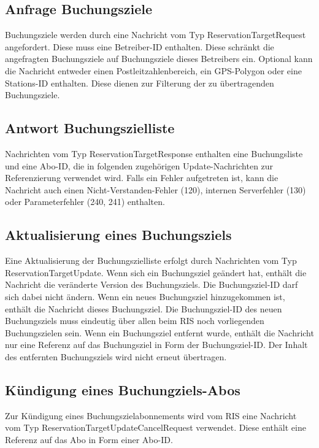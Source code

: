 

\subsection{Anfrage Buchungsziele}
Buchungsziele werden durch eine Nachricht vom Typ ReservationTargetRequest angefordert. Diese muss eine Betreiber-ID enthalten. Diese schränkt die angefragten Buchungsziele auf Buchungsziele dieses Betreibers ein. Optional kann die Nachricht entweder einen Postleitzahlenbereich, ein GPS-Polygon oder eine Stations-ID enthalten. Diese dienen zur Filterung der zu übertragenden Buchungsziele.



\subsection{Antwort Buchungszielliste}
Nachrichten vom Typ ReservationTargetResponse enthalten eine Buchungsliste und eine Abo-ID, die in folgenden zugehörigen Update-Nachrichten zur Referenzierung verwendet wird. Falls ein Fehler aufgetreten ist, kann die Nachricht auch einen Nicht-Verstanden-Fehler (120), internen Serverfehler (130) oder Parameterfehler (240, 241) enthalten.



\subsection{Aktualisierung eines Buchungsziels}
Eine Aktualisierung der Buchungszielliste erfolgt durch Nachrichten vom Typ ReservationTargetUpdate. Wenn sich ein Buchungsziel geändert hat, enthält die Nachricht die veränderte Version des Buchungsziels. Die Buchungsziel-ID darf sich dabei nicht ändern. Wenn ein neues Buchungsziel hinzugekommen ist, enthält die Nachricht dieses Buchungsziel. Die Buchungsziel-ID des neuen Buchungsziels muss eindeutig über allen beim RIS noch vorliegenden Buchungszielen sein. Wenn ein Buchungsziel entfernt wurde, enthält die Nachricht nur eine Referenz auf das Buchungsziel in Form der Buchungsziel-ID. Der Inhalt des entfernten Buchungsziels wird nicht erneut übertragen.



\subsection{Kündigung eines Buchungziels-Abos}
Zur Kündigung eines Buchungszielabonnements wird vom RIS eine Nachricht vom Typ ReservationTargetUpdateCancelRequest verwendet. Diese enthält eine Referenz auf das Abo in Form einer Abo-ID.

